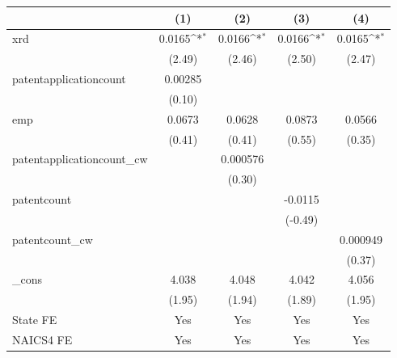 {
\def\sym#1{\ifmmode^{#1}\else\(^{#1}\)\fi}
\begin{tabular}{l*{4}{c}}
\hline\hline
            &\multicolumn{1}{c}{(1)}         &\multicolumn{1}{c}{(2)}         &\multicolumn{1}{c}{(3)}         &\multicolumn{1}{c}{(4)}         \\
\hline
xrd         &      0.0165\sym{*}  &      0.0166\sym{*}  &      0.0166\sym{*}  &      0.0165\sym{*}  \\
            &      (2.49)         &      (2.46)         &      (2.50)         &      (2.47)         \\
[1em]
patentapplicationcount&     0.00285         &                     &                     &                     \\
            &      (0.10)         &                     &                     &                     \\
[1em]
emp         &      0.0673         &      0.0628         &      0.0873         &      0.0566         \\
            &      (0.41)         &      (0.41)         &      (0.55)         &      (0.35)         \\
[1em]
patentapplicationcount\_cw&                     &    0.000576         &                     &                     \\
            &                     &      (0.30)         &                     &                     \\
[1em]
patentcount &                     &                     &     -0.0115         &                     \\
            &                     &                     &     (-0.49)         &                     \\
[1em]
patentcount\_cw&                     &                     &                     &    0.000949         \\
            &                     &                     &                     &      (0.37)         \\
[1em]
\_cons      &       4.038         &       4.048         &       4.042         &       4.056         \\
            &      (1.95)         &      (1.94)         &      (1.89)         &      (1.95)         \\
[1em]
State FE    &         Yes         &         Yes         &         Yes         &         Yes         \\
[1em]
NAICS4 FE   &         Yes         &         Yes         &         Yes         &         Yes         \\

\end{tabular}}
